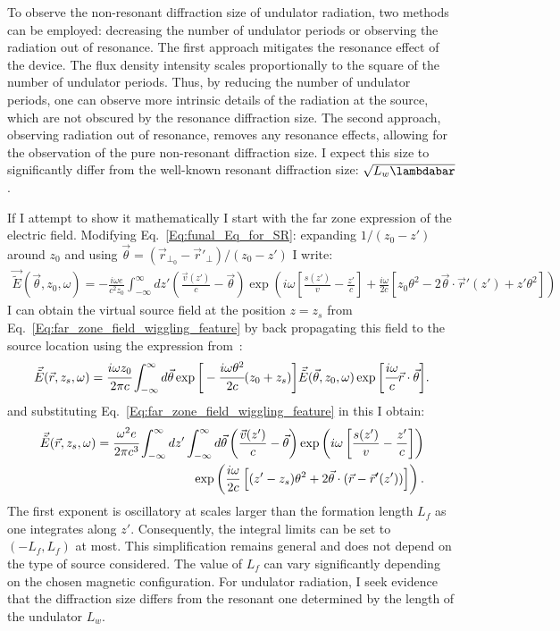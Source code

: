     To observe the non-resonant diffraction size of undulator radiation, two methods can be employed: decreasing the number of undulator periods or observing the radiation out of resonance. The first approach mitigates the resonance effect of the device. The flux density intensity scales proportionally to the square of the number of undulator periods. Thus, by reducing the number of undulator periods, one can observe more intrinsic details of the radiation at the source, which are not obscured by the resonance diffraction size. The second approach, observing radiation out of resonance, removes any resonance effects, allowing for the observation of the pure non-resonant diffraction size. I expect this size to significantly differ from the well-known resonant diffraction size: $\sqrt{L_w \lambdabar}$.
    
    If I attempt to show it mathematically I start with the far zone expression of the electric field. Modifying Eq.~\ref{Eq:funal_Eq_for_SR}: expanding $1/(z_0 - z')$ around $z_0$ and using $\vec{\theta} = (\vec{r}_{\perp_0} - \vec{r}'_{\perp}) / (z_0 - z')$ I write:
    \begin{align}
        \vec{\tilde{E}}(\vec{\theta}, z_0, \omega) = -\frac{i \omega e}{c^2 z_0} \int_{-\infty}^{\infty} dz' \left( \frac{\vec{v}(z')}{c} - \vec{\theta} \right) \exp\left( i \omega \left[ \frac{s(z')}{v} - \frac{z'}{c} \right] + \frac{i \omega}{2 c} \left[ z_0 \theta^2 - 2 \vec{\theta} \cdot \vec{r}'(z') + z' \theta^2 \right] \right)
        \label{Eq:far_zone_field_wiggling_feature}
    \end{align}
    I can obtain the virtual source field at the position $z = z_s$ from Eq.~\ref{Eq:far_zone_field_wiggling_feature} by back propagating this field to the source location using the expression from~\cite{geloni_fourier_2007}:
    \begin{align}
        \vec{\tilde{E}}(\vec{r}, z_s, \omega) = \cfrac{i \omega z_0}{ 2 \pi c}\int_{-\infty}^{\infty} d\vec{\theta} \exp{\bigg[-\cfrac{i \omega \theta^2}{2 c} (z_0 + z_s) \bigg]} \vec{\tilde{E}}(\vec{\theta}, z_0, \omega) \exp{\bigg[\cfrac{i \omega}{c}\vec{r}\cdot\vec{\theta} \bigg]}.
    \end{align}
    and substituting Eq.~\ref{Eq:far_zone_field_wiggling_feature} in this I obtain:
    \begin{align}
        \vec{\tilde{E}}(\vec{r}, z_s, \omega) = \cfrac{\omega^2 e}{2 \pi c^3} \int_{-\infty}^{\infty} dz' \int_{-\infty}^{\infty} d\vec{\theta} \left( \frac{\vec{v}(z')}{c} - \vec{\theta} \right) \exp\left( i \omega \left[ \frac{s(z')}{v} - \frac{z'}{c} \right]\right) \cr \exp\left(\frac{i \omega}{2 c} \left[(z' - z_s)\theta^2 + 2\vec{\theta}\cdot (\vec{r} - \vec{r}'(z')) \right] \right).
    \end{align}   
    The first exponent is oscillatory at scales larger than the formation length $L_f$ as one integrates along $z'$. Consequently, the integral limits can be set to $(-L_f, L_f)$ at most. This simplification remains general and does not depend on the type of source considered. The value of $L_f$ can vary significantly depending on the chosen magnetic configuration. For undulator radiation, I seek evidence that the diffraction size differs from the resonant one determined by the length of the undulator $L_w$.

